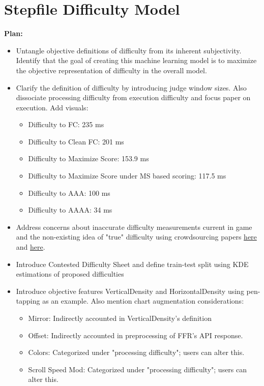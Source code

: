 \section{Stepfile Difficulty Model}
\label{sec:stepfile_difficulty}

\textbf{Plan:}
\begin{itemize}
	\item Untangle objective definitions of difficulty from its inherent subjectivity. Identify that the goal of creating this machine learning model is to maximize the objective representation of difficulty in the overall model.
	      	      
	\item Clarify the definition of difficulty by introducing judge window sizes. Also dissociate processing difficulty from execution difficulty and focus paper on execution. Add visuals:
	      \begin{itemize}
	      	\item Difficulty to FC: 235 ms
	      	\item Difficulty to Clean FC: 201 ms
	      	\item Difficulty to Maximize Score: 153.9 ms
	      	\item Difficulty to Maximize Score under MS based scoring: 117.5 ms
	      	\item Difficulty to AAA: 100 ms
	      	\item Difficulty to AAAA: 34 ms
	      \end{itemize}
	\item Address concerns about inaccurate difficulty measurements current in game and the non-existing idea of "true" difficulty using crowdsourcing papers \href{https://crowdsourcing-class.org/readings/downloads/quality-control/Quality-Management-on-Amazon-Mechanical-Turk.pdf#page4}{here} and \href{https://crowdsourcing-class.org/readings/downloads/ml/EM.pdf}{here}.
	      	      
	      \item{Introduce Contested Difficulty Sheet and define train-test split using KDE estimations of proposed difficulties}
	      	      
	      \item{Introduce objective features VerticalDensity and HorizontalDensity using pen-tapping as an example. Also mention chart augmentation considerations:}
	      \begin{itemize}
	      	\item Mirror: Indirectly accounted in VerticalDensity's definition
	      	\item Offset: Indirectly accounted in preprocessing of FFR's API response.
	      	\item Colors: Categorized under "processing difficulty"; users can alter this.
	      	\item Scroll Speed Mod: Categorized under "processing difficulty"; users can alter this.
	      \end{itemize}
	      	      

\end{itemize}
